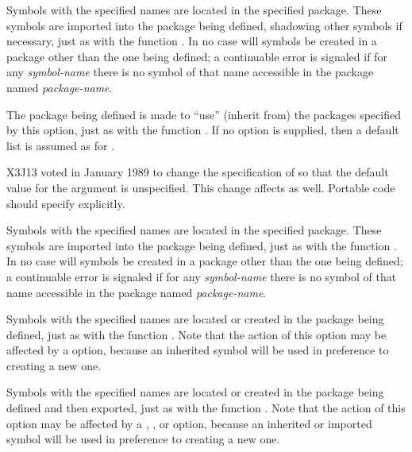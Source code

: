 \begin{new}
\begin{defmac}
\begin{flushdesc}
\item[\cd{(:shadowing-import-from \emph{package-name} \Mstar\emph{symbol-name})}]
Symbols with the specified names are located in the specified package.
These symbols are imported into the package being defined, shadowing
other symbols if necessary, just as with the function .
In no case will symbols be created in a package other than
the one being defined;
a continuable error is signaled if for any \emph{symbol-name} there
is no symbol of that name accessible in the package named \emph{package-name}.

\item[\cd{(:use \Mstar\emph{package-name})}]
The package being defined is made to ``use'' (inherit from)
the packages specified by this option, just as with
the function .
If no  option is supplied, then a default list is assumed
as for .

X3J13 voted in January 1989
to change the specification of  so that the default value
for the  argument is unspecified.  This change affects 
as well.  Portable code should specify  explicitly.

\item[\cd{(:import-from \emph{package-name} \Mstar\emph{symbol-name})}]
Symbols with the specified names are located in the specified package.
These symbols are imported into the package being defined,
just as with the function .
In no case will symbols be created in a package other than
the one being defined;
a continuable error is signaled if for any \emph{symbol-name} there
is no symbol of that name accessible in the package named \emph{package-name}.

\item[\cd{(:intern \Mstar\emph{symbol-name})}]
Symbols with the specified names are located or created
in the package being defined, just as with the function
.  Note that the action of this option may be
affected by a 
option, because an inherited symbol will be used in preference
to creating a new one.

\item[\cd{(:export \Mstar\emph{symbol-name})}]
Symbols with the specified names are located or created
in the package being defined and then exported, just as with the function
.  Note that the action of this option may be
affected by a , , or 
option, because an inherited or imported symbol will be used in preference
to creating a new one.
\end{flushdesc}


\end{defmac}
\end{new}
